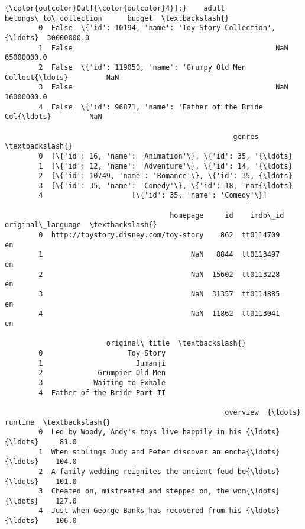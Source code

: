 \documentclass[11pt]{article}
\begin{document}
\begin{Verbatim}[commandchars=\\\{\}]
{\color{outcolor}Out[{\color{outcolor}4}]:}    adult                              belongs\_to\_collection      budget  \textbackslash{}
        0  False  \{'id': 10194, 'name': 'Toy Story Collection', {\ldots}  30000000.0   
        1  False                                                NaN  65000000.0   
        2  False  \{'id': 119050, 'name': 'Grumpy Old Men Collect{\ldots}         NaN   
        3  False                                                NaN  16000000.0   
        4  False  \{'id': 96871, 'name': 'Father of the Bride Col{\ldots}         NaN   
        
                                                      genres  \textbackslash{}
        0  [\{'id': 16, 'name': 'Animation'\}, \{'id': 35, '{\ldots}   
        1  [\{'id': 12, 'name': 'Adventure'\}, \{'id': 14, '{\ldots}   
        2  [\{'id': 10749, 'name': 'Romance'\}, \{'id': 35, {\ldots}   
        3  [\{'id': 35, 'name': 'Comedy'\}, \{'id': 18, 'nam{\ldots}   
        4                     [\{'id': 35, 'name': 'Comedy'\}]   
        
                                       homepage     id    imdb\_id original\_language  \textbackslash{}
        0  http://toystory.disney.com/toy-story    862  tt0114709                en   
        1                                   NaN   8844  tt0113497                en   
        2                                   NaN  15602  tt0113228                en   
        3                                   NaN  31357  tt0114885                en   
        4                                   NaN  11862  tt0113041                en   
        
                        original\_title  \textbackslash{}
        0                    Toy Story   
        1                      Jumanji   
        2             Grumpier Old Men   
        3            Waiting to Exhale   
        4  Father of the Bride Part II   
        
                                                    overview  {\ldots}  runtime  \textbackslash{}
        0  Led by Woody, Andy's toys live happily in his {\ldots}  {\ldots}     81.0   
        1  When siblings Judy and Peter discover an encha{\ldots}  {\ldots}    104.0   
        2  A family wedding reignites the ancient feud be{\ldots}  {\ldots}    101.0   
        3  Cheated on, mistreated and stepped on, the wom{\ldots}  {\ldots}    127.0   
        4  Just when George Banks has recovered from his {\ldots}  {\ldots}    106.0   
        

\end{Verbatim}
\end{document}
